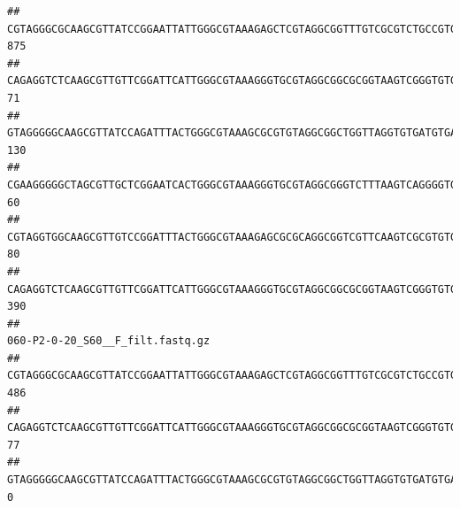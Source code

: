 \documentclass[]{article}
\begin{document}
\begin{verbatim}
## CGTAGGGCGCAAGCGTTATCCGGAATTATTGGGCGTAAAGAGCTCGTAGGCGGTTTGTCGCGTCTGCCGTGAAAGTCCGGGGCTCAACTCCGGATCTGCGGTGGGTACGGGCAGACTAGAGTGATGTAGGGGAGACTGGAATTCCTGGTGTAGCGGTGAAATGCGCAGATATCAGGAGGAACACCGATGGCGAAGGCAGGTCTCTGGGCATTAACTGACGCTGAGGAGCGAAAGCATGGGGAGCGAACA                               875
## CAGAGGTCTCAAGCGTTGTTCGGATTCATTGGGCGTAAAGGGTGCGTAGGCGGCGCGGTAAGTCGGGTGTGAAATCTCGGAGCTTAACTCCGAAACTGCATTCGATACTGCCGTGCTTGAGGACTGGAGAGGAGACTGGAATTTACGGTGTAGCGGTGAAATGCGTAGATATCGTAAGGAAGACCAGTGGCGAAGGCGGGTCTCTGGACAGTTCCTGACGCTGAGGCACGAAGGCCAGGGGAGCAAACG                                71
## GTAGGGGGCAAGCGTTATCCAGATTTACTGGGCGTAAAGCGCGTGTAGGCGGCTGGTTAGGTGTGATGTGAAATCTTCCGGCTCAACCGGAAAACTGCATTGCAAACCGGCCTGGCTAGAGTGCAGGAGAGGGAAGCGGAATTCCAGGTGTAGCGGTGAAATGCGTAGATATCTGGAGGAACACCAGTGGCGAAGGCGGCTTCCTGGCCTGCAACTGACGCTGAGACGCGAAAGCGTGGGGAGCGAAC                                130
## CGAAGGGGGCTAGCGTTGCTCGGAATCACTGGGCGTAAAGGGTGCGTAGGCGGGTCTTTAAGTCAGGGGTGAAATCCTGGAGCTCAACTCCAGAACTGCCTTTGATACTGAAGATCTTGAGTTCGGGAGAGGTGAGTGGAACTGCGAGTGTAGAGGTGAAATTCGTAGATATTCGCAAGAACACCAGTGGCGAAGGCGGCTCACTGGCCCGATACTGACGCTGAGGCACGAAAGCGTGGGGAGCAAACA                                60
## CGTAGGTGGCAAGCGTTGTCCGGATTTACTGGGCGTAAAGAGCGCGCAGGCGGTCGTTCAAGTCGCGTGTGAAAGCCCCCGGCTCAACTGGGGAGGGTCACGCGATACTGATCGACTCGAAGGCAGGAGAGGGTAGTGGAATTCCCGGTGTAGTGGTGAAATGCGTAGATATCGGGAGGAACACCAGTGGCGAAGGCGACTACCTGGCCTGTTCTTGACGCTGAGGCGCGAAAGCTAGGGGAGCAAACG                                80
## CAGAGGTCTCAAGCGTTGTTCGGATTCATTGGGCGTAAAGGGTGCGTAGGCGGCGCGGTAAGTCGGGTGTGAAATCTCGGGGCTTAACTCCGAAACTGCATTCGATACTGCCGTGCTTGAGGACTGGAGAGGAGACTGGAATTTACGGTGTAGCGGTGAAATGCGTAGATATCGTAAGGAAGACCAGTGGCGAAGGCGGGTCTCTGGACAGTTCCTGACGCTGAGGCACGAAGGCCAGGGGAGCAAACG                               390
##                                                                                                                                                                                                                                                           060-P2-0-20_S60__F_filt.fastq.gz
## CGTAGGGCGCAAGCGTTATCCGGAATTATTGGGCGTAAAGAGCTCGTAGGCGGTTTGTCGCGTCTGCCGTGAAAGTCCGGGGCTCAACTCCGGATCTGCGGTGGGTACGGGCAGACTAGAGTGATGTAGGGGAGACTGGAATTCCTGGTGTAGCGGTGAAATGCGCAGATATCAGGAGGAACACCGATGGCGAAGGCAGGTCTCTGGGCATTAACTGACGCTGAGGAGCGAAAGCATGGGGAGCGAACA                              486
## CAGAGGTCTCAAGCGTTGTTCGGATTCATTGGGCGTAAAGGGTGCGTAGGCGGCGCGGTAAGTCGGGTGTGAAATCTCGGAGCTTAACTCCGAAACTGCATTCGATACTGCCGTGCTTGAGGACTGGAGAGGAGACTGGAATTTACGGTGTAGCGGTGAAATGCGTAGATATCGTAAGGAAGACCAGTGGCGAAGGCGGGTCTCTGGACAGTTCCTGACGCTGAGGCACGAAGGCCAGGGGAGCAAACG                               77
## GTAGGGGGCAAGCGTTATCCAGATTTACTGGGCGTAAAGCGCGTGTAGGCGGCTGGTTAGGTGTGATGTGAAATCTTCCGGCTCAACCGGAAAACTGCATTGCAAACCGGCCTGGCTAGAGTGCAGGAGAGGGAAGCGGAATTCCAGGTGTAGCGGTGAAATGCGTAGATATCTGGAGGAACACCAGTGGCGAAGGCGGCTTCCTGGCCTGCAACTGACGCTGAGACGCGAAAGCGTGGGGAGCGAAC                                 0

\end{verbatim}
\end{document}

